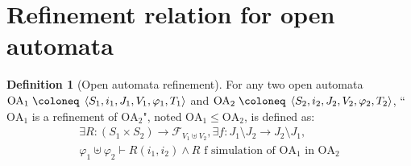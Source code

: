 \documentclass{article}
\theoremstyle{plain}
\theoremstyle{definition}
\newtheorem{defi}{Definition}
\newcommand\mpar[1]{{\left(#1\right)}}
\newcommand\defobject{\DOTSB\;{\coloneq}\;}
\newcommand\formulae{{\mathcal{F}}}
\newcommand\OA[6]{\left<#1,#2,#3,#4,#5,#6\right>}
\begin{document}
\section{Refinement relation for open automata}
\begin{defi}[Open automata refinement]
For any two open automata \(\mathrm{OA}_1 \defobject \OA{S_1}{i_1}{J_1}{V_1}{\varphi_1}{T_1}\) and \(\mathrm{OA}_2 \defobject \OA{S_2}{i_2}{J_2}{V_2}{\varphi_2}{T_2}\), ``\(\mathrm{OA}_1\) is a refinement of \(\mathrm{OA}_2\)", noted \(\mathrm{OA}_1 \leq \mathrm{OA}_2\), is defined as:
\begin{multline*}
	\exists R: \mpar{S_1 \times S_2} \to \formulae_{V_1 \uplus V_2}, \exists f: J_1 \setminus J_2 \to J_2 \setminus J_1, \\
	\varphi_1 \uplus \varphi_2 \vdash R\mpar{i_1, i_2} \wedge R \text{ f simulation of } \mathrm{OA}_1 \text{ in } \mathrm{OA}_2
\end{multline*}
\end{defi}
\end{document}
